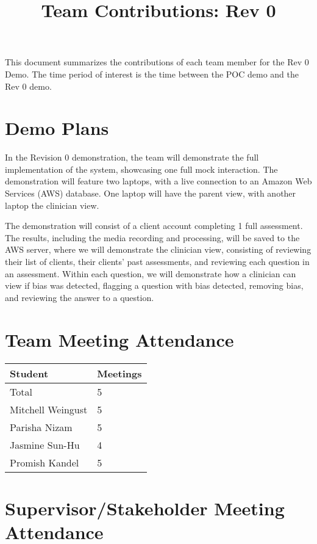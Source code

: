 \documentclass{article}
\title{Team Contributions: Rev 0\\\progname}
\author{\authname}
\date{}
\begin{document}
\maketitle

This document summarizes the contributions of each team member for the Rev 0
Demo.  The time period of interest is the time between the POC demo and the Rev
0 demo.

\section{Demo Plans}

\hspace{2em} In the Revision 0 demonstration, the team will demonstrate the full implementation of the system, showcasing
one full mock interaction. The demonstration will feature two laptops, with a live connection to an Amazon Web Services (AWS)
database. One laptop will have the parent view, with another laptop the clinician view.

The demonstration will consist of a client account completing 1 full assessment. The results, including the media recording and processing, will be saved
to the AWS server, where we will demonstrate the clinician view, consisting of reviewing their list of clients, their clients' past assessments,
and reviewing each question in an assessment. Within each question, we will demonstrate how a clinician can view if bias was detected, flagging a question
with bias detected, removing bias, and reviewing the answer to a question.

\section{Team Meeting Attendance}

\begin{table}[H]
\centering
\begin{tabular}{ll}
\toprule
\textbf{Student} & \textbf{Meetings}\\
\midrule
Total & 5\\
Mitchell Weingust & 5\\
Parisha Nizam & 5\\
Jasmine Sun-Hu & 4\\
Promish Kandel & 5\\
\bottomrule
\end{tabular}
\end{table}

\section{Supervisor/Stakeholder Meeting Attendance}
\end{document}
